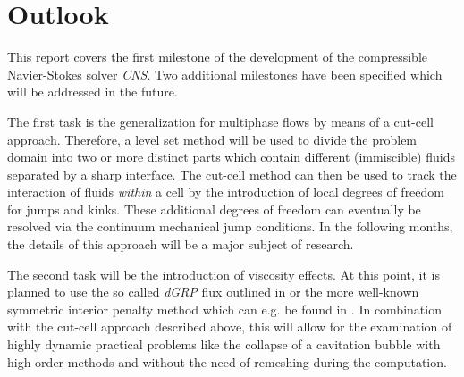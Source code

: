 \section{Outlook}
\label{sec:outlook}

This report covers the first milestone of the development of the compressible
Navier-Stokes solver \emph{CNS}. Two additional milestones have been specified
which will be addressed in the future.

The first task is the generalization for multiphase flows by means
of a cut-cell approach. Therefore, a level set method will be used to divide the
problem domain into two or more distinct parts which contain different
(immiscible) fluids separated by a sharp interface. The cut-cell method can then
be used to track the interaction of fluids \emph{within} a cell by the
introduction of local degrees of freedom for jumps and kinks. These additional
degrees of freedom can eventually be resolved via the continuum mechanical jump
conditions. In the following months, the details of this approach will be a
major subject of research.

The second task will be the introduction of viscosity effects. At this
point, it is planned to use the so called \emph{dGRP} flux outlined in
\cite{GassnerMunz2007} or the more well-known symmetric interior penalty method
which can e.g. be found in \cite{Arnold1982}. In combination with the
cut-cell approach described above, this will allow for the examination of
highly dynamic practical problems like the collapse of a cavitation bubble with
high order methods and without the need of remeshing during the computation.
